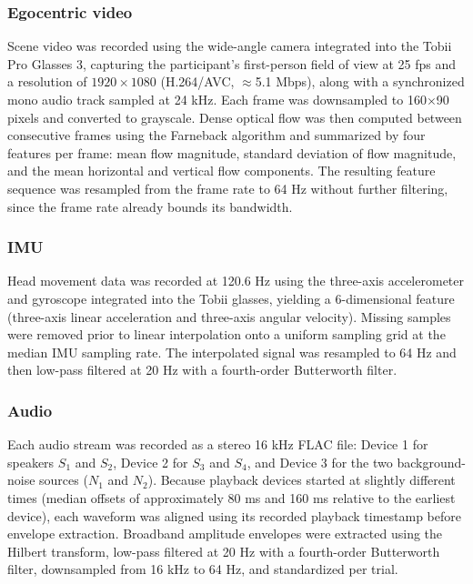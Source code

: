 \documentclass[journal]{IEEEtran}
\begin{document}
\subsubsection{Egocentric video}

Scene video was recorded using the wide-angle camera integrated into the Tobii Pro Glasses 3, capturing the participant's first-person field of view at 25 fps and a resolution of $1920 \times 1080$ (H.264/AVC, $\approx$5.1 Mbps), along with a synchronized mono audio track sampled at 24 kHz. Each frame was downsampled to 160$\times$90 pixels and converted to grayscale. Dense optical flow was then computed between consecutive frames using the Farneback algorithm \cite{farneback2003two} and summarized by four features per frame: mean flow magnitude, standard deviation of flow magnitude, and the mean horizontal and vertical flow components. The resulting feature sequence was resampled from the frame rate to 64 Hz without further filtering, since the frame rate already bounds its bandwidth.

\subsubsection{IMU}

Head movement data was recorded at 120.6 Hz using the three-axis accelerometer and gyroscope integrated into the Tobii glasses, yielding a 6-dimensional feature (three-axis linear acceleration and three-axis angular velocity). Missing samples were removed prior to linear interpolation onto a uniform sampling grid at the median IMU sampling rate. The interpolated signal was resampled to 64 Hz and then low-pass filtered at 20 Hz with a fourth-order Butterworth filter.

\subsubsection{Audio}

Each audio stream was recorded as a stereo 16 kHz FLAC file: Device 1 for speakers $S_1$ and $S_2$, Device 2 for $S_3$ and $S_4$, and Device 3 for the two background-noise sources ($N_1$ and $N_2$). Because playback devices started at slightly different times (median offsets of approximately 80 ms and 160 ms relative to the earliest device), each waveform was aligned using its recorded playback timestamp before envelope extraction. %
Broadband amplitude envelopes were extracted using the Hilbert transform, low-pass filtered at 20 Hz with a fourth-order Butterworth filter, downsampled from 16 kHz to 64 Hz, and standardized per trial.
\end{document}
